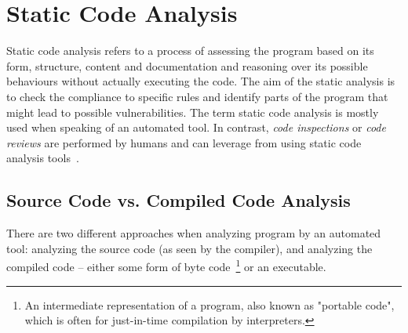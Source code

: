 \documentclass[
  digital, %
  table,   %
  lof,     %
  lot,     %
  oneside,
]{fithesis3}
\begin{document}
%
%  
%
%
%
  
\section{Static Code Analysis}
Static code analysis refers to a process of assessing the program based on its form, structure, content and documentation and reasoning over its possible behaviours without actually executing the code. The aim of the static analysis is to check the compliance to specific rules and identify parts of the program that might lead to possible vulnerabilities. The term static code analysis is mostly used when speaking of an automated tool. In contrast, \textit{code inspections} or \textit{code reviews} are performed by humans and can leverage from using static code analysis tools~\cite{oswap-sca, ppt-sca}.

\subsection{Source Code vs. Compiled Code Analysis}
There are two different approaches when analyzing program by an automated tool: analyzing the source code (as seen by the compiler), and analyzing the compiled code -- either some form of byte code~\footnote{An intermediate representation of a program, also known as "portable code", which is often for just-in-time compilation by interpreters.} or an executable.
\end{document}
